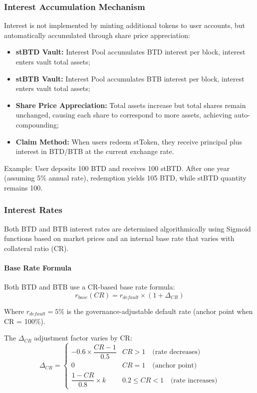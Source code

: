 \documentclass{article}
\begin{document}
\subsubsection{Interest Accumulation Mechanism}
Interest is not implemented by minting additional tokens to user accounts, but automatically accumulated through share price appreciation:
\begin{itemize}
  \item \textbf{stBTD Vault:} Interest Pool accumulates BTD interest per block, interest enters vault total assets;
  \item \textbf{stBTB Vault:} Interest Pool accumulates BTB interest per block, interest enters vault total assets;
  \item \textbf{Share Price Appreciation:} Total assets increase but total shares remain unchanged, causing each share to correspond to more assets, achieving auto-compounding;
  \item \textbf{Claim Method:} When users redeem stToken, they receive principal plus interest in BTD/BTB at the current exchange rate.
\end{itemize}

Example: User deposits 100 BTD and receives 100 stBTD. After one year (assuming 5\% annual rate), redemption yields 105 BTD, while stBTD quantity remains 100.

\subsubsection{Interest Rates}
\label{sec:interest-rates}
Both BTD and BTB interest rates are determined algorithmically using Sigmoid functions based on market prices and an internal base rate that varies with collateral ratio (CR).

\paragraph{Base Rate Formula}
Both BTD and BTB use a CR-based base rate formula:
\begin{equation}
r_{base}(CR) = r_{default} \times (1 + \Delta_{CR})
\end{equation}

Where $r_{default} = 5\%$ is the governance-adjustable default rate (anchor point when CR = 100\%).

The $\Delta_{CR}$ adjustment factor varies by CR:
\begin{equation}
\Delta_{CR} = \begin{cases}
-0.6 \times \dfrac{CR - 1}{0.5} & CR > 1 \quad \text{(rate decreases)} \\[0.5em]
0 & CR = 1 \quad \text{(anchor point)} \\[0.5em]
\dfrac{1 - CR}{0.8} \times k & 0.2 \leq CR < 1 \quad \text{(rate increases)}
\end{cases}
\end{equation}
\end{document}
